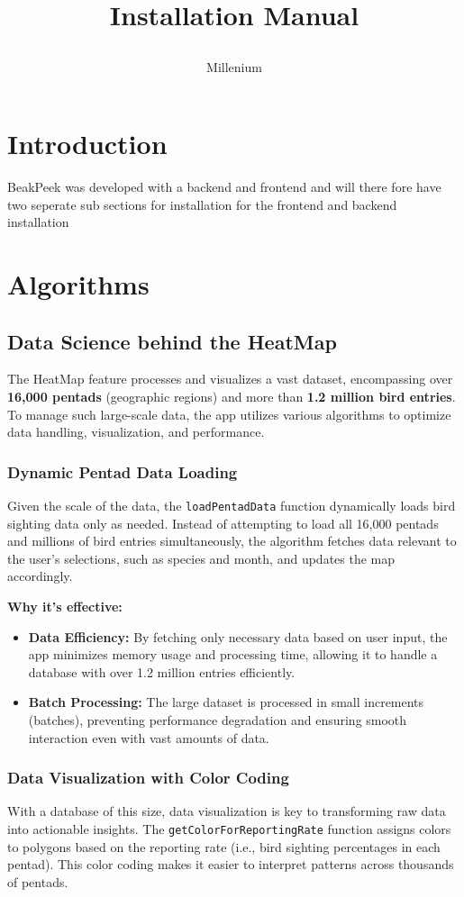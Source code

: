 \documentclass{article}
\title{

\\
{Installation Manual}
}
\author{Millenium}
\begin{document}
\tableofcontents

\newpage


\section{Introduction}


BeakPeek was developed with a backend and frontend and will there fore have two
seperate sub sections for installation for the frontend and backend installation
\section{Algorithms}
\subsection{Data Science behind the HeatMap}

The HeatMap feature processes and visualizes a vast dataset, encompassing over \textbf{16,000 pentads} (geographic regions) and more than \textbf{1.2 million bird entries}. To manage such large-scale data, the app utilizes various algorithms to optimize data handling, visualization, and performance.

\subsubsection{Dynamic Pentad Data Loading}
Given the scale of the data, the \texttt{loadPentadData} function dynamically loads bird sighting data only as needed. Instead of attempting to load all 16,000 pentads and millions of bird entries simultaneously, the algorithm fetches data relevant to the user's selections, such as species and month, and updates the map accordingly.

\textbf{Why it's effective:}
\begin{itemize}
    \item \textbf{Data Efficiency:} By fetching only necessary data based on user input, the app minimizes memory usage and processing time, allowing it to handle a database with over 1.2 million entries efficiently.
    \item \textbf{Batch Processing:} The large dataset is processed in small increments (batches), preventing performance degradation and ensuring smooth interaction even with vast amounts of data.
\end{itemize}

\subsubsection{Data Visualization with Color Coding}
With a database of this size, data visualization is key to transforming raw data into actionable insights. The \texttt{getColorForReportingRate} function assigns colors to polygons based on the reporting rate (i.e., bird sighting percentages in each pentad). This color coding makes it easier to interpret patterns across thousands of pentads.
\end{document}
